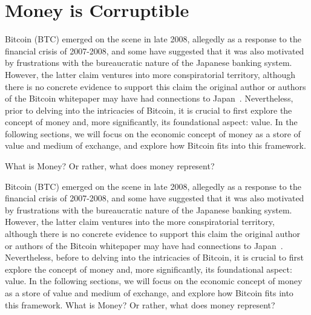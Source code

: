 \section{Money is Corruptible}
Bitcoin (BTC) emerged on the scene in late 2008, allegedly as a response to the financial crisis of 2007-2008, and some have suggested that it was also
motivated by frustrations with the bureaucratic nature of the Japanese banking system. However, the latter claim ventures into more conspiratorial
territory, although there is no concrete evidence to support this claim the original author or authors of the Bitcoin whitepaper may have had connections
to Japan~\cite{nakamoto2008bitcoin}. Nevertheless, prior to delving into the intricacies of Bitcoin, it is crucial to first explore the concept of money
and, more significantly, its foundational aspect: value. In the following sections, we will focus on the economic concept of money as a store of value and
medium of exchange, and explore how Bitcoin fits into this framework.

What is Money? Or rather, what does money represent?

Bitcoin (BTC) emerged on the scene in late 2008, allegedly as a response to the
ﬁnancial crisis of 2007-2008, and some have suggested that it was also motivated by
frustrations with the bureaucratic nature of the Japanese banking system. However, the
latter claim ventures into the more conspiratorial territory, although there is no
concrete evidence to support this claim the original author or authors of the Bitcoin
whitepaper may have had connections to Japan~\cite{nakamoto2008bitcoin}. Nevertheless, before to delving into
the intricacies of Bitcoin, it is crucial to ﬁrst explore the concept of money and, more
signiﬁcantly, its foundational aspect: value. In the following sections, we will focus on the
economic concept of money as a store of value and medium of exchange, and explore how
Bitcoin ﬁts into this framework.
What is Money? Or rather, what does money represent?



